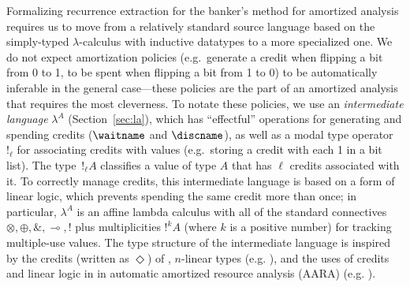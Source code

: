 Formalizing recurrence extraction for the banker's method for amortized
analysis requires us to move
from a relatively standard source language based on the simply-typed
$\lambda$-calculus with inductive datatypes to a more specialized one.
We do not expect amortization policies (e.g.\ generate a credit when
flipping a bit from 0 to 1, to be spent when flipping a bit from 1 to 0)
to be automatically inferable in the general case---these policies are the part
of an amortized analysis that requires the most cleverness.  To notate
these policies, we use an \emph{intermediate language} $\lambda^A$
(Section~\ref{sec:la}), which has ``effectful'' operations for
generating and spending credits ($\waitname$ and $\discname$), as well
as a modal type operator $!_\ell$ for associating credits with values
(e.g.\ storing a credit with each 1 in a bit list).  The type~$!_\ell A$
classifies a value of type $A$ that has $\ell$ credits associated with
it.  To correctly manage credits, this intermediate language is based on
a form of linear logic, which prevents spending the same credit more
than once; in particular, $\lambda^A$ is an affine lambda calculus with
all of the standard connectives $\otimes, \oplus, \&, \multimap, !$ plus
multiplicities $!^k A$ (where $k$ is a positive number) for tracking
multiple-use values.  The type structure of the intermediate language is
inspired by the credits (written as $\Diamond$) of
\cite{hofmann02diamonds,hofmann03diamonds-journal}, $n$-linear types
(e.g. \cite{girard-et-al:tcs92:bll,reed:names-useless,mcbride:plenty-o-nuttin,atkey:lics18}),
and the uses of credits and linear logic in in automatic amortized
resource analysis (AARA)
(e.g. \cite{hofmannjost03aara,hoffmann-et-al:toplas12:multivariate-amortized,knoth+19resourceguided}).

